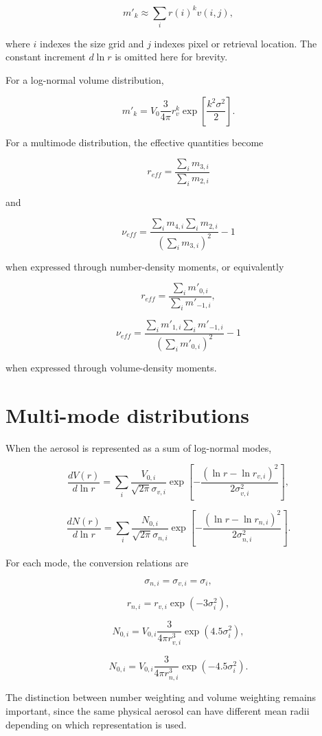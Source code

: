 \documentclass[
  11pt,
  letterpaper,
  DIV=11,
  numbers=noendperiod]{scrreprt}
\begin{document}
\[
m'_k \approx \sum_i r(i)^k v(i,j),
\]

where \(i\) indexes the size grid and \(j\) indexes pixel or retrieval
location. The constant increment \(d\ln r\) is omitted here for brevity.

For a log-normal volume distribution,

\[
m'_k =V_{0} \frac{3}{4 \pi} r^{k}_v\exp\left[\frac{k^2\sigma^2}{2} \right].
\]

For a multimode distribution, the effective quantities become

\[
r_{eff}=\frac{\sum_i m_{3,i}}{\sum_i m_{2,i}}
\]

and

\[
\nu_{eff}=\frac{\sum_i m_{4,i} \sum_i m_{2,i}}{(\sum_i m_{3,i})^2}-1
\]

when expressed through number-density moments, or equivalently

\[
r_{eff}=\frac{\sum_i m'_{0,i}}{\sum_i m'_{-1,i}},
\]

\[
\nu_{eff}=\frac{\sum_i m'_{1,i} \sum_i m'_{-1,i}}{(\sum_i m'_{0,i})^2}-1
\]

when expressed through volume-density moments.

\section{Multi-mode distributions}\label{multi-mode-distributions}

When the aerosol is represented as a sum of log-normal modes,

\[
\frac{d V(r)}{d \ln r}= \sum_i \frac{V_{0,i}}{\sqrt{2 \pi} \sigma_{v,i}} \exp\left[-\frac{(\ln r-\ln r_{v,i})^2}{2 \sigma_{v,i}^2}\right],
\]

\[
\frac{d N(r)}{d \ln r}= \sum_i \frac{N_{0,i}}{\sqrt{2 \pi} \sigma_{n,i}} \exp\left[-\frac{(\ln r-\ln r_{n,i})^2}{2 \sigma_{n,i}^2}\right].
\]

For each mode, the conversion relations are

\[
\sigma_{n,i}=\sigma_{v,i}=\sigma_i,
\]

\[
r_{n,i}=r_{v,i} \exp(-3 \sigma_{i}^2),
\]

\[
N_{0,i}=V_{0,i} \frac{3}{4 \pi r_{v,i}^3}\exp(4.5 \sigma_{i}^2),
\]

\[
N_{0,i}=V_{0,i} \frac{3}{4 \pi r_{n,i}^3}\exp(-4.5 \sigma_{i}^2).
\]

The distinction between number weighting and volume weighting remains
important, since the same physical aerosol can have different mean radii
depending on which representation is used.
\end{document}
